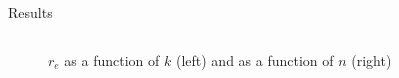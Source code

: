 \documentclass{beamer}
\begin{document}
\begin{frame}{Results}
\begin{figure}
\begin{tabular}{cc}
\end{tabular}
\caption{$r_e$ as a function of $k$ (left) and as a function of $n$ (right) }
\label{fig:1000plot}
\end{figure}

\end{frame}
\end{document}
